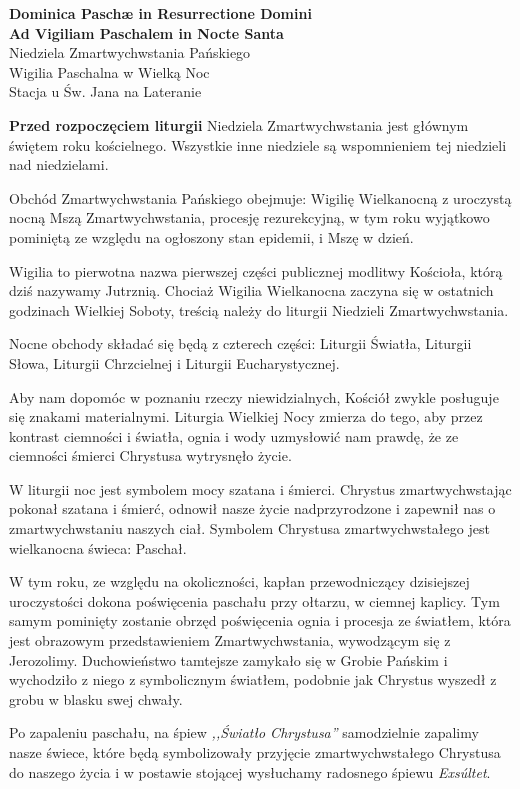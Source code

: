 \documentclass[10pt,oneside,final,notitlepage,a4paper,wide]{mwart}
\begin{document}
%
\begin{center}
	\LARGE{\textbf{Dominica Paschæ in Resurrectione Domini\\Ad Vigiliam Paschalem in Nocte Santa}}\\ \smallskip
	\small{Niedziela Zmartwychwstania Pańskiego\\Wigilia Paschalna w Wielką Noc\\ \smallskip Stacja u Św. Jana na Lateranie}
\end{center} \vspace{1cm}

	\textbf{Przed rozpoczęciem liturgii} Niedziela Zmartwychwstania jest głównym świętem roku kościelnego. Wszystkie inne niedziele są wspomnieniem tej niedzieli nad niedzielami.
\par Obchód Zmartwychwstania Pańskiego obejmuje: Wigilię Wielkanocną z uroczystą nocną Mszą Zmartwychwstania, procesję rezurekcyjną, w tym roku wyjątkowo pominiętą ze względu na ogłoszony stan epidemii, i Mszę w dzień.
\par Wigilia to pierwotna nazwa pierwszej części publicznej modlitwy Kościoła, którą dziś nazywamy Jutrznią. Chociaż Wigilia Wielkanocna zaczyna się w ostatnich godzinach Wielkiej Soboty, treścią należy do liturgii Niedzieli Zmartwychwstania.
\par Nocne obchody składać się będą z czterech części: Liturgii Światła, Liturgii Słowa, Liturgii Chrzcielnej i Liturgii Eucharystycznej.
\par Aby nam dopomóc w poznaniu rzeczy niewidzialnych, Kościół zwykle posługuje się znakami materialnymi. Liturgia Wielkiej Nocy zmierza do tego, aby przez kontrast ciemności i światła, ognia i wody uzmysłowić nam prawdę, że ze ciemności śmierci Chrystusa wytrysnęło życie.
\par W liturgii noc jest symbolem mocy szatana i śmierci. Chrystus zmartwychwstając pokonał szatana i śmierć, odnowił nasze życie nadprzyrodzone i zapewnił nas o zmartwychwstaniu naszych ciał. Symbolem Chrystusa zmartwychwstałego jest wielkanocna świeca: Paschał.
\par W tym roku, ze względu na okoliczności, kapłan przewodniczący dzisiejszej uroczystości dokona poświęcenia paschału przy ołtarzu, w ciemnej kaplicy. Tym samym pominięty zostanie obrzęd poświęcenia ognia i procesja ze światłem, która jest obrazowym przedstawieniem Zmartwychwstania, wywodzącym się z Jerozolimy. Duchowieństwo tamtejsze zamykało się w Grobie Pańskim i wychodziło z niego z symbolicznym światłem, podobnie jak Chrystus wyszedł z grobu w blasku swej chwały.
\par Po zapaleniu paschału, na śpiew \emph{,,Światło Chrystusa''} samodzielnie zapalimy nasze świece, które będą symbolizowały przyjęcie zmartwychwstałego Chrystusa do naszego życia i w postawie stojącej wysłuchamy radosnego śpiewu \emph{Exsúltet}. \bigskip
\end{document}
